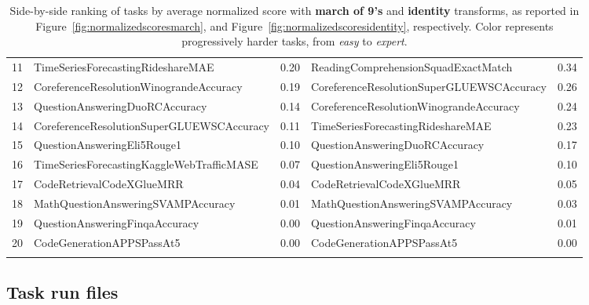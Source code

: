 \documentclass{fairmeta}
\begin{document}
\begin{longtable}{%
  >{\footnotesize}r
  >{\arraybackslash\footnotesize}p{}
  >{\footnotesize}r
  >{\arraybackslash\footnotesize}p{}
  >{\footnotesize}r
}
\rowcolor{hard!15} 11 & TimeSeriesForecastingRideshareMAE                  & 0.20 & ReadingComprehensionSquadExactMatch           & 0.34 \\
\rowcolor{hard!15} 12 & CoreferenceResolutionWinograndeAccuracy            & 0.19 & CoreferenceResolutionSuperGLUEWSCAccuracy     & 0.26 \\
\rowcolor{hard!15} 13 & QuestionAnsweringDuoRCAccuracy                     & 0.14 & CoreferenceResolutionWinograndeAccuracy       & 0.24 \\
\rowcolor{hard!15} 14 & CoreferenceResolutionSuperGLUEWSCAccuracy          & 0.11 & TimeSeriesForecastingRideshareMAE             & 0.23 \\
\rowcolor{hard!15} 15 & QuestionAnsweringEli5Rouge1                        & 0.10 & QuestionAnsweringDuoRCAccuracy                & 0.17 \\

\hline

\rowcolor{expert!15} 16 & TimeSeriesForecastingKaggleWebTrafficMASE          & 0.07 & QuestionAnsweringEli5Rouge1                   & 0.10 \\
\rowcolor{expert!15} 17 & CodeRetrievalCodeXGlueMRR                          & 0.04 & CodeRetrievalCodeXGlueMRR                     & 0.05 \\
\rowcolor{expert!15} 18 & MathQuestionAnsweringSVAMPAccuracy                 & 0.01 & MathQuestionAnsweringSVAMPAccuracy            & 0.03 \\
\rowcolor{expert!15} 19 & QuestionAnsweringFinqaAccuracy                     & 0.00 & QuestionAnsweringFinqaAccuracy                & 0.01 \\
\rowcolor{expert!15} 20 & CodeGenerationAPPSPassAt5                          & 0.00 & CodeGenerationAPPSPassAt5                     & 0.00 \\



\bottomrule

\caption{ \centering Side-by-side ranking of tasks by average normalized score with \textbf{march of 9's} and \textbf{identity} transforms, as reported in Figure~\ref{fig:normalizedscoresmarch}, and Figure~\ref{fig:normalizedscoresidentity}, respectively. Color represents progressively harder tasks, from \textit{easy} to \textit{expert}.}
\end{longtable}


\subsection{Task run files}
\end{document}
